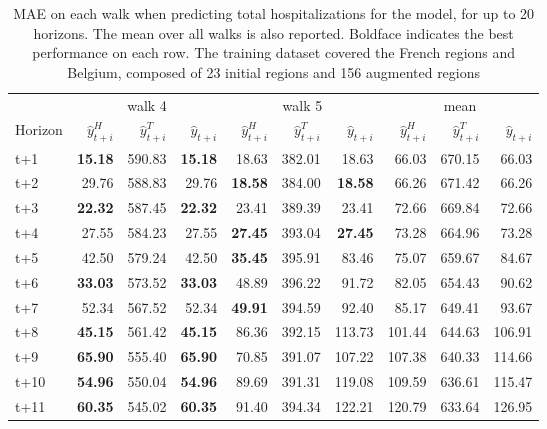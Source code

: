 \begin{table}[H]
\centering
\caption{MAE on each walk when predicting total hospitalizations for the model, for up to 20 horizons. The mean over all walks is also reported. Boldface indicates the best performance on each row. The training dataset covered the French regions and Belgium, composed of 23 initial regions and 156 augmented regions }
\label{tab:MAE_walk_assemble}
\begin{tabular}{lrrrrrrrrr}
\toprule
 & \multicolumn{3}{c}{walk 4} & \multicolumn{3}{c}{walk 5} & \multicolumn{3}{c}{mean} 
\\

\cmidrule(lr){2-4} \cmidrule(lr){5-7} \cmidrule(lr){8-10} 
Horizon & $\hat{y}_{t+i}^H$ & $\hat{y}_{t+i}^T$ & $\hat{y}_{t+i}$ & $\hat{y}_{t+i}^H$ & $\hat{y}_{t+i}^T$ & $\hat{y}_{t+i}$ & $\hat{y}_{t+i}^H$ & $\hat{y}_{t+i}^T$ & $\hat{y}_{t+i}$ \\
\midrule
t+1  & \textbf{15.18}  & 590.83  & \textbf{15.18}  & 18.63  & 382.01  & 18.63  & 66.03  & 670.15  & 66.03  \\
t+2  & 29.76  & 588.83  & 29.76  & \textbf{18.58}  & 384.00  & \textbf{18.58}  & 66.26  & 671.42  & 66.26  \\
t+3  & \textbf{22.32}  & 587.45  & \textbf{22.32}  & 23.41  & 389.39  & 23.41  & 72.66  & 669.84  & 72.66  \\
t+4  & 27.55  & 584.23  & 27.55  & \textbf{27.45}  & 393.04  & \textbf{27.45}  & 73.28  & 664.96  & 73.28  \\
t+5  & 42.50  & 579.24  & 42.50  & \textbf{35.45}  & 395.91  & 83.46  & 75.07  & 659.67  & 84.67  \\
t+6  & \textbf{33.03}  & 573.52  & \textbf{33.03}  & 48.89  & 396.22  & 91.72  & 82.05  & 654.43  & 90.62  \\
t+7  & 52.34  & 567.52  & 52.34  & \textbf{49.91}  & 394.59  & 92.40  & 85.17  & 649.41  & 93.67  \\
t+8  & \textbf{45.15}  & 561.42  & \textbf{45.15}  & 86.36  & 392.15  & 113.73  & 101.44  & 644.63  & 106.91  \\
t+9  & \textbf{65.90}  & 555.40  & \textbf{65.90}  & 70.85  & 391.07  & 107.22  & 107.38  & 640.33  & 114.66  \\
t+10  & \textbf{54.96}  & 550.04  & \textbf{54.96}  & 89.69  & 391.31  & 119.08  & 109.59  & 636.61  & 115.47  \\
t+11  & \textbf{60.35}  & 545.02  & \textbf{60.35}  & 91.40  & 394.34  & 122.21  & 120.79  & 633.64  & 126.95  \\

\end{tabular}
\end{table}
